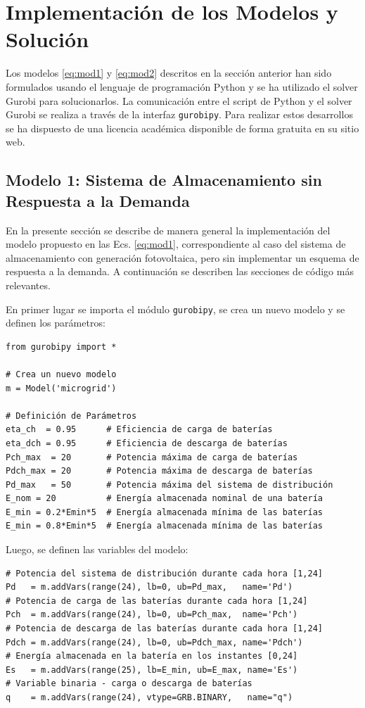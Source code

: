 \section{Implementación de los Modelos y Solución}\label{sec:implementacion}
Los modelos \eqref{eq:mod1} y \eqref{eq:mod2} descritos en la sección anterior han sido formulados usando el lenguaje de programación Python y se ha utilizado el solver Gurobi \cite{gurobi} para solucionarlos. La comunicación entre el script de Python y el solver Gurobi se realiza a través de la interfaz \texttt{gurobipy}. Para realizar estos desarrollos se ha dispuesto de una licencia académica disponible de forma gratuita en su sitio web.

\subsection{Modelo 1: Sistema de Almacenamiento sin Respuesta a la Demanda}\label{sec:mod1}
En la presente sección se describe de manera general la implementación del modelo propuesto en las Ecs. \eqref{eq:mod1}, correspondiente al caso del sistema de almacenamiento con generación fotovoltaica, pero sin implementar un esquema de respuesta a la demanda. A continuación se describen las secciones de código más relevantes.

En primer lugar se importa el módulo \texttt{gurobipy}, se crea un nuevo modelo y se definen los parámetros:
\begin{verbatim}
from gurobipy import *

# Crea un nuevo modelo
m = Model('microgrid')

# Definición de Parámetros
eta_ch  = 0.95      # Eficiencia de carga de baterías
eta_dch = 0.95      # Eficiencia de descarga de baterías
Pch_max  = 20       # Potencia máxima de carga de baterías 
Pdch_max = 20       # Potencia máxima de descarga de baterías 
Pd_max   = 50       # Potencia máxima del sistema de distribución
E_nom = 20          # Energía almacenada nominal de una batería
E_min = 0.2*Emin*5  # Energía almacenada mínima de las baterías
E_min = 0.8*Emin*5  # Energía almacenada mínima de las baterías
\end{verbatim}

Luego, se definen las variables del modelo:
\begin{verbatim}
# Potencia del sistema de distribución durante cada hora [1,24]
Pd   = m.addVars(range(24), lb=0, ub=Pd_max,   name='Pd')
# Potencia de carga de las baterías durante cada hora [1,24]
Pch  = m.addVars(range(24), lb=0, ub=Pch_max,  name='Pch')
# Potencia de descarga de las baterías durante cada hora [1,24]
Pdch = m.addVars(range(24), lb=0, ub=Pdch_max, name='Pdch')
# Energía almacenada en la batería en los instantes [0,24]
Es   = m.addVars(range(25), lb=E_min, ub=E_max, name='Es')
# Variable binaria - carga o descarga de baterías
q    = m.addVars(range(24), vtype=GRB.BINARY,   name="q")
\end{verbatim}

